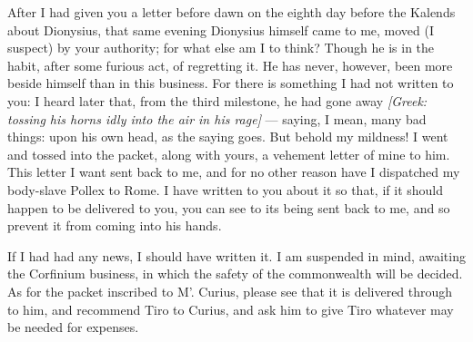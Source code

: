 

 After I had given you a letter before dawn on the eighth day before the Kalends about Dionysius, that same evening Dionysius himself came to me, moved (I suspect) by your authority; for what else am I to think? Though he is in the habit, after some furious act, of regretting it. He has never, however, been more beside himself than in this business. For there is something I had not written to you: I heard later that, from the third milestone, he had gone away \textit{[Greek: tossing his horns idly into the air in his rage]} --- saying, I mean, many bad things: upon his own head, as the saying goes. But behold my mildness! I went and tossed into the packet, along with yours, a vehement letter of mine to him. This letter I want sent back to me, and for no other reason have I dispatched my body-slave Pollex to Rome. I have written to you about it so that, if it should happen to be delivered to you, you can see to its being sent back to me, and so prevent it from coming into his hands.

 If I had had any news, I should have written it. I am suspended in mind, awaiting the Corfinium business, in which the safety of the commonwealth will be decided. As for the packet inscribed to M'. Curius, please see that it is delivered through to him, and recommend Tiro to Curius, and ask him to give Tiro whatever may be needed for expenses.
